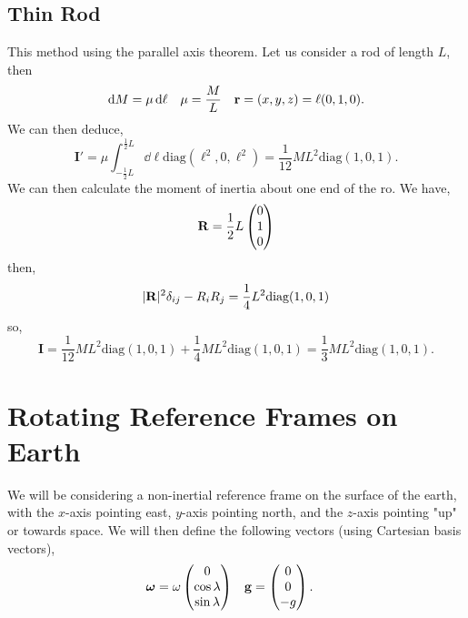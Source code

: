 \documentclass{book}
\begin{document}
\section{Thin Rod}
This method using the parallel axis theorem. Let us consider a rod of length $L$, then
\begin{align}
    \dd{M} = \mu\dd{\ell} && \mu = \frac{M}{L} && \vb{r} = (x,y,z) = \ell(0,1,0).
\end{align}
We can then deduce,
\begin{equation}
    \mathbf{I}' = \mu\int_{-\frac{1}{2}L}^{\frac{1}{2}L}\dd{\ell}\text{diag}(\ell^2,0,\ell^2) = \frac{1}{12}ML^2\text{diag}(1,0,1).
\end{equation}
We can then calculate the moment of inertia about one end of the ro. We have,
\begin{equation}
    \vb{R} = \frac{1}{2}L\begin{pmatrix}
        0 \\ 1 \\ 0
    \end{pmatrix}
\end{equation}
then,
\begin{equation}
    |\vb{R}|^2\delta_{ij} - R_iR_j = \frac{1}{4}L^2\text{diag}(1,0,1)
\end{equation}
so,
\begin{equation}
    \mathbf{I} = \frac{1}{12}ML^2\text{diag}(1,0,1) + \frac{1}{4}ML^2\text{diag}(1,0,1) = \frac{1}{3}ML^2\text{diag}(1,0,1).
\end{equation}
\chapter{Rotating Reference Frames on Earth}
\noindent We will be considering a non-inertial reference frame on the surface of the earth, with the $x$-axis pointing east, $y$-axis pointing north, and the $z$-axis pointing "up" or towards space. We will then define the following vectors (using Cartesian basis vectors), 
\begin{align}
    \vb*{\omega} &= \omega\begin{pmatrix}
        0 \\
        \cos\lambda \\
        \sin\lambda
    \end{pmatrix} 
    &
    \vb{g} &= \begin{pmatrix}
        0 \\
        0 \\
        -g
    \end{pmatrix}.
\end{align}
\end{document}
